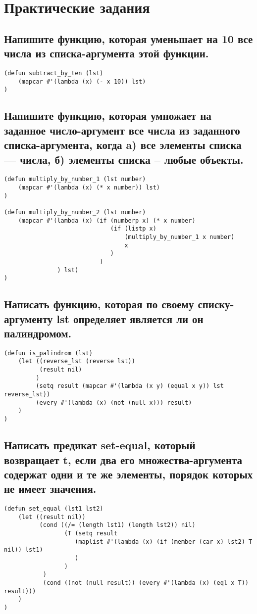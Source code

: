 \chapter{Практические задания}
\section{Напишите функцию, которая уменьшает на 10 все числа из списка-аргумента этой функции.}

\begin{lstlisting}[basicstyle=\footnotesize, caption={Задание 1}]
(defun subtract_by_ten (lst)
	(mapcar #'(lambda (x) (- x 10)) lst)
)
\end{lstlisting}

\section{Напишите функцию, которая умножает на заданное число-аргумент все числа из заданного списка-аргумента, когда 	a) все элементы списка --- числа, 	б) элементы списка -- любые объекты.}
\begin{lstlisting}[basicstyle=\footnotesize, caption={Задание 2}]
(defun multiply_by_number_1 (lst number)
	(mapcar #'(lambda (x) (* x number)) lst)
)

(defun multiply_by_number_2 (lst number)
	(mapcar #'(lambda (x) (if (numberp x) (* x number) 
							  (if (listp x) 
							      (multiply_by_number_1 x number) 
							      x
							  ) 
						   )
			   ) lst)
)
\end{lstlisting}

\newpage
\section{Написать функцию, которая по своему списку-аргументу lst определяет является ли он палиндромом.}
\begin{lstlisting}[basicstyle=\footnotesize, caption=Задание 3]
(defun is_palindrom (lst)
	(let ((reverse_lst (reverse lst))
		  (result nil)
		 )
		 (setq result (mapcar #'(lambda (x y) (equal x y)) lst reverse_lst))
		 (every #'(lambda (x) (not (null x))) result)
	)
)
\end{lstlisting}

\section{Написать предикат set-equal, который возвращает t, если два его множества-аргумента содержат одни и те же элементы, порядок которых не имеет значения.}
\begin{lstlisting}[basicstyle=\footnotesize, caption=Задание 4]
(defun set_equal (lst1 lst2)
	(let ((result nil))
		  (cond ((/= (length lst1) (length lst2)) nil)
				 (T (setq result 
					(maplist #'(lambda (x) (if (member (car x) lst2) T nil)) lst1)
					)
				 )
		   )
		   (cond ((not (null result)) (every #'(lambda (x) (eql x T)) result)))
	)
)
\end{lstlisting}

